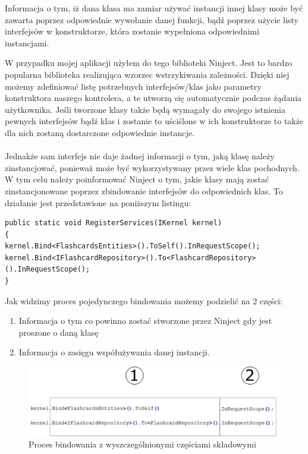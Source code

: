 Informacja o tym, iż dana klasa ma zamiar używać instancji innej klasy może być zawarta poprzez odpowiednie wywołanie danej funkcji, bądź poprzez użycie listy interfejsów w konstruktorze, która zostanie wypełniona odpowiednimi instancjami.

W przypadku mojej aplikacji użyłem do tego biblioteki Ninject\cite{NinjectGithub}. Jest to bardzo popularna biblioteka realizująca wzorzec wstrzykiwania zależności. Dzięki niej możemy zdefiniować listę potrzebnych interfejsów/klas jako parametry konstruktora naszego kontrolera, a te utworzą się automatycznie podczas żądania użytkownika. Jeśli tworzone klasy także będą wymagały do swojego istnienia pewnych interfejsów bądź klas i zostanie to uściślone w ich konstruktorze to także dla nich zostaną dostarczone odpowiednie instancje.
\\ \\
Jednakże sam interfejs nie daje żadnej informacji o tym, jaką klasę należy zinstancjować, ponieważ może być wykorzystywany przez wiele klas pochodnych. W tym celu należy poinformować Ninject o tym, jakie klasy mają zostać zinstancjonowane poprzez zbindowanie interfejsów do odpowiednich klas. To działanie jest przedstawione na poniższym listingu:
\begin{lstlisting}[frame=single, numbers=none,captionpos=b, 
caption={Przykładowy kod bindowania dla biblioteki Ninject}]
public static void RegisterServices(IKernel kernel)
{
kernel.Bind<FlashcardsEntities>().ToSelf().InRequestScope();
kernel.Bind<IFlashcardRepository>().To<FlashcardRepository>().InRequestScope();
}
\end{lstlisting}

Jak widzimy proces pojedynczego bindowania możemy podzielić na 2 części:

\begin{enumerate}
	\item Informacja o tym co powinno zostać stworzone przez Ninject gdy jest proszone o daną klasę
	\item Informacja o zasięgu współużywania danej instancji.
\end{enumerate}

\begin{figure}[h]
	\centering
	\includegraphics[width=\textwidth]{images/ninject.png}
	 \caption{Proces bindowania z wyszczególnionymi częściami składowymi}
\end{figure}

